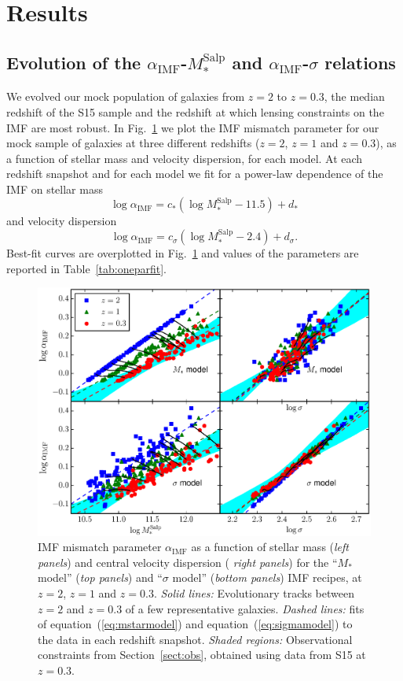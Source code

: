 \documentclass[usenatbib]{mnras}
\def\msalp{M_*^{\mathrm{Salp}}}
\def\aimf{\alpha_{\mathrm{IMF}}}
\def\Sref#1{Section~\ref{#1}\xspace}
\def\Fref#1{Fig.~\ref{#1}\xspace}
\def\Tref#1{Table~\ref{#1}\xspace}
\def\Eref#1{equation~(\ref{#1})\xspace}
\begin{document}

\section{Results}\label{sect:results}

\subsection{Evolution of the $\aimf$-$\msalp$ and $\aimf$-$\sigma$ relations}

We evolved our mock population of galaxies from $z=2$ to $z=0.3$, the
median redshift of the S15 sample and the redshift at which lensing constraints on the IMF are most robust. In \Fref{fig:snap} we
plot the IMF mismatch parameter for our mock sample of galaxies at
three different redshifts ($z=2$, $z=1$ and $z=0.3$), as a function of
stellar mass and velocity dispersion, for each model.
At each redshift snapshot and for each model we fit for a power-law dependence of the IMF on stellar mass 
%
\begin{equation}\label{eq:mstarmodel}
\log{\aimf} = c_*(\log{\msalp} - 11.5) + d_*
\end{equation}
%
and velocity dispersion
%
\begin{equation}\label{eq:sigmamodel}
\log{\aimf} = c_\sigma(\log{\msalp} - 2.4) + d_\sigma.
\end{equation}
%
Best-fit curves are overplotted in \Fref{fig:snap} and values of the parameters are reported in \Tref{tab:oneparfit}.
%
\begin{figure}
 \includegraphics[width=\textwidth]{snapshots.eps}
 \caption{ IMF mismatch parameter $\aimf$ as a function of stellar
   mass ({\em left panels}) and central velocity dispersion ({\em
     right panels}) for the ``$M_*$ model'' ({\em top panels}) and
   ``$\sigma$ model'' ({\em bottom panels}) IMF recipes, at $z=2$,
   $z=1$ and $z=0.3$.  {\em Solid lines:} Evolutionary tracks between
   $z=2$ and $z=0.3$ of a few representative galaxies.  {\em Dashed
     lines:} fits of \Eref{eq:mstarmodel} and \Eref{eq:sigmamodel} to the data in each redshift snapshot. {\em
     Shaded regions:} Observational constraints from \Sref{sect:obs},
   obtained using data from S15 at $z=0.3$.   }
 \label{fig:snap}
\end{figure}
\end{document}
